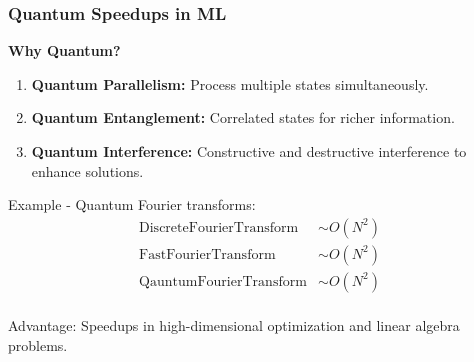 \documentclass{beamer}
\begin{document}
\begin{frame}
\frametitle{Quantum Speedups in ML}

\textbf{Why Quantum?}
\begin{block}{}
\begin{enumerate}
\item \textbf{Quantum Parallelism:} Process multiple states simultaneously.

\item \textbf{Quantum Entanglement:} Correlated states for richer information.

\item \textbf{Quantum Interference:} Constructive and destructive interference to enhance solutions.
\end{enumerate}

\noindent
\end{block}

\begin{block}{}
Example - Quantum Fourier transforms:
\begin{align*}
\mathrm{Discrete Fourier Transform} & \sim O(N^2)\\
\mathrm{Fast Fourier Transform} & \sim O(N^2)\\
\mathrm{Qauntum Fourier Transform} & \sim O(N^2)\\
\end{align*}
\end{block}

Advantage: Speedups in high-dimensional optimization and linear algebra problems.
\end{frame}
\end{document}

